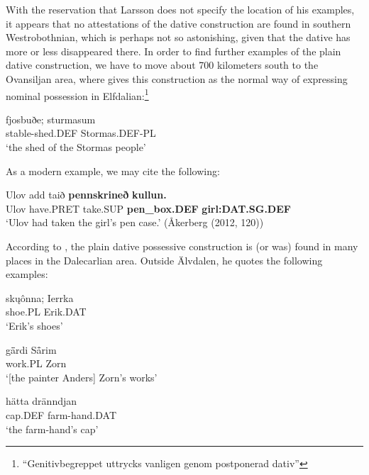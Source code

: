 With the reservation that Larsson does not specify the location of his examples, it appears that no attestations of the dative construction are found in southern Westrobothnian, which is perhaps not so astonishing, given that the dative has more or less disappeared there. In order to find further examples of the plain dative construction, we have to move about 700 kilometers south to the Ovansiljan area, where \citet[97]{Levander1909} gives this construction as the normal way of expressing nominal possession in Elfdalian:\footnote{ “Genitivbegreppet uttrycks vanligen genom postponerad dativ”}


\ea\label{}
\gll fjosbuðe;  sturmasum\\
stable-shed.DEF  Stormas.DEF-PL\\
\glt ‘the shed of the Stormas people’
\z

As a modern example, we may cite the following:


\ea\label{}
\gll Ulov  add  taið  \textbf{pennskrineð} \textbf{kullun.}\\
Ulov  have.PRET  take.SUP  \textbf{pen\_box.DEF} \textbf{girl:DAT.SG.DEF}\\
\glt ‘Ulov had taken the girl’s pen case.’ (Åkerberg (2012, 120))
\z

According to \citet[112]{Levander1928}, the plain dative possessive construction is (or was) found in many places in the Dalecarlian area. Outside Älvdalen, he quotes the following examples:


\ea\label{}
\gll sk\k{u}ônna;  Ierrka\\
shoe.PL  Erik.DAT\\
\glt ‘Erik’s shoes’
\z

\ea\label{}
\gll g\={ä}rdi  S\={å}rim\\
work.PL  Zorn\\
\glt ‘[the painter Anders] Zorn’s works’ 
\z

\ea\label{}
\gll hätta  dränndjan\\
cap.DEF  farm-hand.DAT\\
\glt ‘the farm-hand’s cap’
\z

